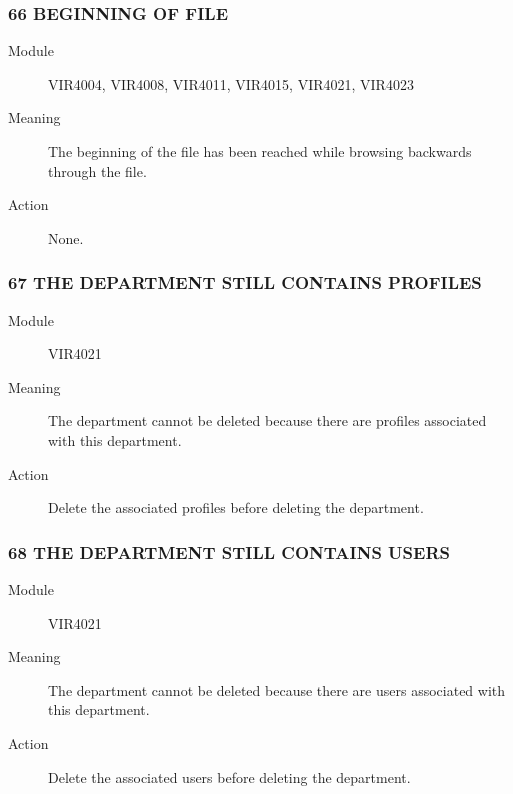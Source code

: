 \documentclass[letterpaper,10pt,english]{sphinxmanual}
\begin{document}
\subsubsection{66 BEGINNING OF FILE}
\label{\detokenize{messages:beginning-of-file}}\begin{description}
\item[{Module}] \leavevmode
VIR4004, VIR4008, VIR4011, VIR4015, VIR4021, VIR4023

\item[{Meaning}] \leavevmode
The beginning of the file has been reached while browsing backwards through the file.

\item[{Action}] \leavevmode
None.

\end{description}


\subsubsection{67 THE DEPARTMENT STILL CONTAINS PROFILES}
\label{\detokenize{messages:the-department-still-contains-profiles}}\begin{description}
\item[{Module}] \leavevmode
VIR4021

\item[{Meaning}] \leavevmode
The department cannot be deleted because there are profiles associated with this department.

\item[{Action}] \leavevmode
Delete the associated profiles before deleting the department.

\end{description}


\subsubsection{68 THE DEPARTMENT STILL CONTAINS USERS}
\label{\detokenize{messages:the-department-still-contains-users}}\begin{description}
\item[{Module}] \leavevmode
VIR4021

\item[{Meaning}] \leavevmode
The department cannot be deleted because there are users associated with this department.

\item[{Action}] \leavevmode
Delete the associated users before deleting the department.

\end{description}
\end{document}

